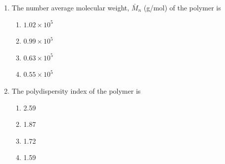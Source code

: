 \documentclass[a4paper,10pt]{article}
\begin{document}
\begin{enumerate}
\item The number average molecular weight, $\bar{M}_n$ (g/mol) of the polymer is
\hfill{}

\begin{multicols}{2}
\begin{enumerate}
\item $1.02 \times 10^5$
\item $0.99 \times 10^5$
\item $0.63 \times 10^5$
\item $0.55 \times 10^5$
\end{enumerate}
\end{multicols}

\item The polydispersity index of the polymer is
\hfill{}

\begin{multicols}{4}
\begin{enumerate}
\item 2.59
\item 1.87
\item 1.72
\item 1.59
\end{enumerate}
\end{multicols}
\end{enumerate}
\end{document}
